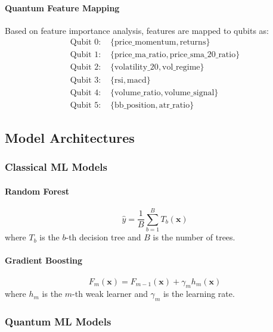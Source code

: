 \documentclass[12pt,a4paper]{article}
\begin{document}
\paragraph{Quantum Feature Mapping}
Based on feature importance analysis, features are mapped to qubits as:
\begin{align}
\text{Qubit 0: } & \{\text{price\_momentum}, \text{returns}\} \\
\text{Qubit 1: } & \{\text{price\_ma\_ratio}, \text{price\_sma\_20\_ratio}\} \\
\text{Qubit 2: } & \{\text{volatility\_20}, \text{vol\_regime}\} \\
\text{Qubit 3: } & \{\text{rsi}, \text{macd}\} \\
\text{Qubit 4: } & \{\text{volume\_ratio}, \text{volume\_signal}\} \\
\text{Qubit 5: } & \{\text{bb\_position}, \text{atr\_ratio}\}
\end{align}

\subsection{Model Architectures}

\subsubsection{Classical ML Models}

\paragraph{Random Forest}
\begin{equation}
\hat{y} = \frac{1}{B}\sum_{b=1}^{B} T_b(\mathbf{x})
\end{equation}
where $T_b$ is the $b$-th decision tree and $B$ is the number of trees.

\paragraph{Gradient Boosting}
\begin{equation}
F_m(\mathbf{x}) = F_{m-1}(\mathbf{x}) + \gamma_m h_m(\mathbf{x})
\end{equation}
where $h_m$ is the $m$-th weak learner and $\gamma_m$ is the learning rate.

\subsubsection{Quantum ML Models}
\end{document}
